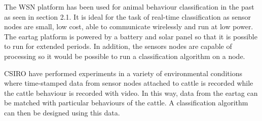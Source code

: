 The WSN platform has been used for animal behaviour classification in the past as seen in section 2.1. It is ideal for the task of real-time classification as sensor nodes are small, low cost, able to communicate wirelessly and run at low power. The eartag platform is powered by a battery and solar panel so that it is possible to run for extended periods. In addition, the sensors nodes are capable of processing so it would be possible to run a classification algorithm on a node. 

CSIRO have performed experiments in a variety of environmental conditions where time-stamped data from sensor nodes attached to cattle is recorded while the cattle behaviour is recorded with video. In this way, data from the eartag can be matched with particular behaviours of the cattle. A classification algorithm can then be designed using this data.